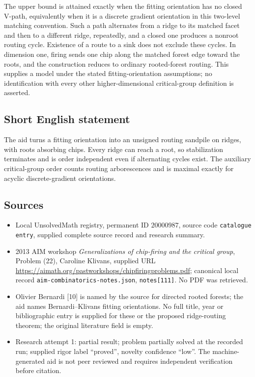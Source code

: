\documentclass[11pt]{article}
\begin{document}
The upper bound is attained exactly when the fitting orientation has no closed V-path, equivalently when it is a discrete gradient orientation in this two-level matching convention. Such a path alternates from a ridge to its matched facet and then to a different ridge, repeatedly, and a closed one produces a nonroot routing cycle. Existence of a route to a sink does not exclude these cycles. In dimension one, firing sends one chip along the matched forest edge toward the roots, and the construction reduces to ordinary rooted-forest routing. This supplies a model under the stated fitting-orientation assumptions; no identification with every other higher-dimensional critical-group definition is asserted.
\subsection{Short English statement}
The aid turns a fitting orientation into an unsigned routing sandpile on ridges, with roots absorbing chips. Every ridge can reach a root, so stabilization terminates and is order independent even if alternating cycles exist. The auxiliary critical-group order counts routing arborescences and is maximal exactly for acyclic discrete-gradient orientations.
\subsection{Sources}
\begin{itemize}
\item Local UnsolvedMath registry, permanent ID $20000987$, source code \texttt{catalogue entry}, supplied complete source record and research summary.
\item 2013 AIM workshop \emph{Generalizations of chip-firing and the critical group}, Problem (22), Caroline Klivans, supplied URL \url{https://aimath.org/pastworkshops/chipfiringproblems.pdf}; canonical local record \texttt{aim-combinatorics-notes.json}, \texttt{notes[111]}. No PDF was retrieved.
\item Olivier Bernardi [10] is named by the source for directed rooted forests; the aid names Bernardi--Klivans fitting orientations. No full title, year or bibliographic entry is supplied for these or the proposed ridge-routing theorem; the original literature field is empty.
\item Research attempt 1: partial result; problem partially solved at the recorded run; supplied rigor label ``proved'', novelty confidence ``low''. The machine-generated aid is not peer reviewed and requires independent verification before citation.
\end{itemize}
\end{document}
